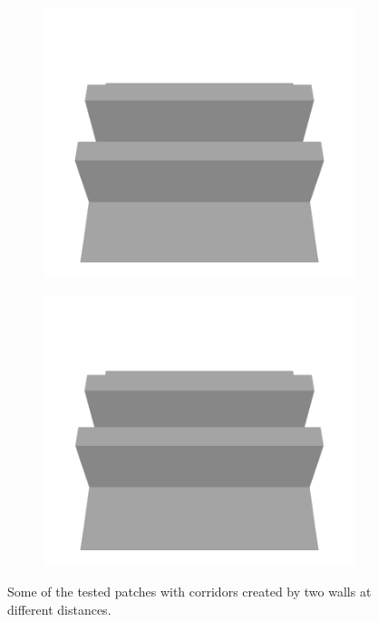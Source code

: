 \begin{figure}[htbp]
\begin{subfigure}[b]{0.24\linewidth}
    \includegraphics[width=\linewidth]{../img/5/custom_patches/tunnel/all/08-3d.png}
    \end{subfigure}
    \begin{subfigure}[b]{0.24\linewidth}
    \includegraphics[width=\linewidth]{../img/5/custom_patches/tunnel/all/09-3d.png}
    \end{subfigure}
    \caption{Some of the tested patches with corridors created by two walls at different distances.}
    \label{fig : tunnels}
\end{figure}
